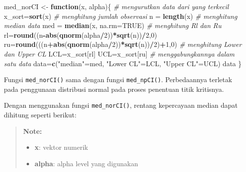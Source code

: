 \documentclass[]{book}
\newenvironment{Shaded}{\begin{snugshade}}{\end{snugshade}}
\newcommand{\KeywordTok}[1]{\textcolor[rgb]{0.13,0.29,0.53}{\textbf{#1}}}
\newcommand{\DataTypeTok}[1]{\textcolor[rgb]{0.13,0.29,0.53}{#1}}
\newcommand{\DecValTok}[1]{\textcolor[rgb]{0.00,0.00,0.81}{#1}}
\newcommand{\StringTok}[1]{\textcolor[rgb]{0.31,0.60,0.02}{#1}}
\newcommand{\CommentTok}[1]{\textcolor[rgb]{0.56,0.35,0.01}{\textit{#1}}}
\newcommand{\OtherTok}[1]{\textcolor[rgb]{0.56,0.35,0.01}{#1}}
\newcommand{\ControlFlowTok}[1]{\textcolor[rgb]{0.13,0.29,0.53}{\textbf{#1}}}
\newcommand{\OperatorTok}[1]{\textcolor[rgb]{0.81,0.36,0.00}{\textbf{#1}}}
\newcommand{\NormalTok}[1]{#1}
\providecommand{\tightlist}{%
  \setlength{\itemsep}{0pt}\setlength{\parskip}{0pt}}
\begin{document}
\begin{Shaded}
\begin{Highlighting}[]
\NormalTok{med_norCI <-}\StringTok{ }\ControlFlowTok{function}\NormalTok{(x, alpha)\{}
  \CommentTok{# mengurutkan data dari yang terkecil}
\NormalTok{  x_sort=}\KeywordTok{sort}\NormalTok{(x)}
  \CommentTok{# menghitung jumlah observasi}
\NormalTok{  n =}\StringTok{ }\KeywordTok{length}\NormalTok{(x)}
  \CommentTok{# menghitung median data}
\NormalTok{  med =}\StringTok{ }\KeywordTok{median}\NormalTok{(x, }\DataTypeTok{na.rm=}\OtherTok{TRUE}\NormalTok{)}
  \CommentTok{# menghitung Rl dan Ru}
\NormalTok{  rl=}\KeywordTok{round}\NormalTok{((n}\OperatorTok{-}\KeywordTok{abs}\NormalTok{(}\KeywordTok{qnorm}\NormalTok{(alpha}\OperatorTok{/}\DecValTok{2}\NormalTok{))}\OperatorTok{*}\KeywordTok{sqrt}\NormalTok{(n))}\OperatorTok{/}\DecValTok{2}\NormalTok{,}\DecValTok{0}\NormalTok{)}
\NormalTok{  ru=}\KeywordTok{round}\NormalTok{(((n}\OperatorTok{+}\KeywordTok{abs}\NormalTok{(}\KeywordTok{qnorm}\NormalTok{(alpha}\OperatorTok{/}\DecValTok{2}\NormalTok{))}\OperatorTok{*}\KeywordTok{sqrt}\NormalTok{(n))}\OperatorTok{/}\DecValTok{2}\NormalTok{)}\OperatorTok{+}\DecValTok{1}\NormalTok{,}\DecValTok{0}\NormalTok{)}
  \CommentTok{# menghitung Lower dan Upper CL}
\NormalTok{  LCL=x_sort[rl]}
\NormalTok{  UCL=x_sort[ru]}
  \CommentTok{# menggabungkannya dalam satu data}
\NormalTok{  data=}\KeywordTok{c}\NormalTok{(}\StringTok{"median"}\NormalTok{=med,}
                  \StringTok{"Lower CL"}\NormalTok{=LCL,}
                  \StringTok{"Upper CL"}\NormalTok{=UCL)}
\NormalTok{  data}
\NormalTok{\}}
\end{Highlighting}
\end{Shaded}

Fungsi \texttt{med\_norCI()} sama dengan fungsi \texttt{med\_npCI()}.
Perbedaannya terletak pada penggunaan distribusi normal pada proses
penentuan titik kritisnya.

Dengan menggunakan fungsi \texttt{med\_norCI()}, rentang kepercayaan
median dapat dihitung seperti berikut:

\begin{quote}
\textbf{Note: }

\begin{itemize}
\tightlist
\item
  \textbf{x}: vektor numerik
\item
  \textbf{alpha}: alpha level yang digunakan
\end{itemize}
\end{quote}
\end{document}
